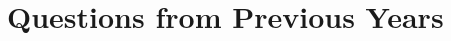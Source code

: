\documentclass[../main-sheet.tex]{subfiles}
\begin{document}
\chapter*{Questions from Previous Years}
\end{document}
